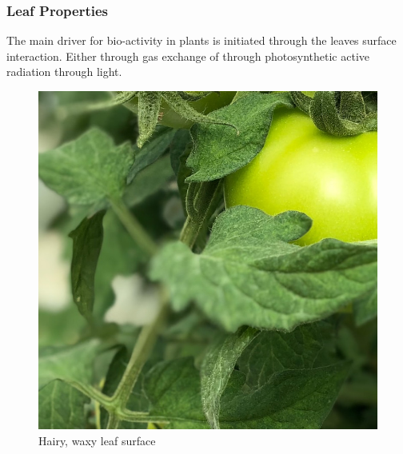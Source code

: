 \subsubsection*{Leaf Properties}

The main driver for bio-activity in plants is initiated through the leaves surface interaction.
Either through gas exchange of through photosynthetic active radiation through light.

\begin{figure}[H]
    \centering
    \begin{minipage}[b]{0.49\textwidth}
        \includegraphics[width=\textwidth]{user-view/plant4_leaf_Soo_Ann_Woon_Unsplash.jpg}
        \caption{Hairy, waxy leaf surface}
    \end{minipage}
    \hfill
    \begin{minipage}[b]{0.49\textwidth}

\end{minipage}
\end{figure}
